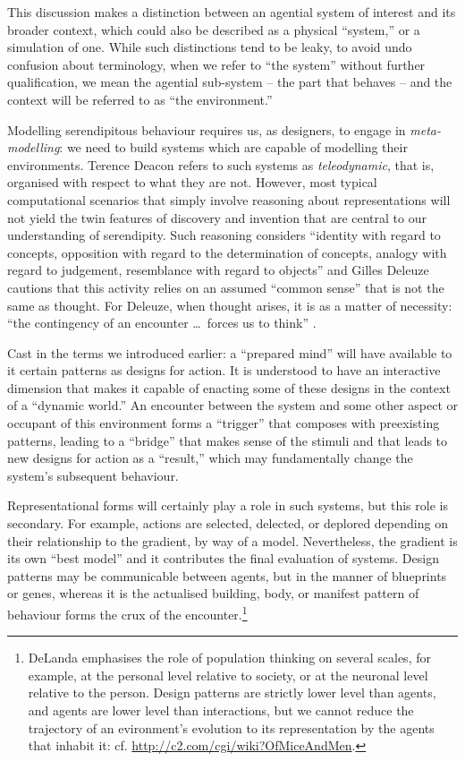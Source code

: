 This discussion makes a distinction between an agential system of
interest and its broader context, which could also be described as a
physical ``system,'' or a simulation of one.  While such distinctions
tend to be leaky, to avoid undo confusion about terminology, when we
refer to ``the system'' without further qualification, we mean the
agential sub-system -- the part that behaves -- and the context will
be referred to as ``the environment.''

Modelling serendipitous behaviour requires us, as designers, to engage
in \emph{meta-modelling}: we need to build systems which are capable
of modelling their environments.  Terence Deacon
\cite{deacon2006emergence} refers to such systems as
\emph{teleodynamic}, that is, organised with respect to what they are
not.
%
However, most typical computational scenarios that simply involve reasoning
about representations will not yield the twin features of discovery
and invention that are central to our understanding of serendipity.
Such reasoning considers
%
``identity with regard to concepts, opposition with regard to the determination of concepts, analogy with regard to judgement, resemblance with regard to objects''
%
and Gilles Deleuze \cite[p. 174]{deleuze1994difference} cautions that
this activity relies on an assumed ``common sense'' that is not the
same as thought.  For Deleuze, when thought arises, it is as a matter
of necessity: ``the contingency of an encounter \ldots\ forces us to
think'' \cite[p. 176]{deleuze1994difference}.

Cast in the terms we introduced earlier: a ``prepared mind'' will have
available to it certain patterns as designs for action.  It is
understood to have an interactive dimension that makes it capable of
enacting some of these designs in the context of a ``dynamic world.''
An encounter between the system and some other aspect or occupant of
this environment forms a ``trigger'' that composes with preexisting
patterns, leading to a ``bridge'' that makes sense of the stimuli and
that leads to new designs for action as a ``result,'' which may
fundamentally change the system's subsequent behaviour.

Representational forms will certainly play a role in such systems, but
this role is secondary.  For example, actions are selected, delected,
or deplored depending on their relationship to the gradient, by way of
a model.  Nevertheless, the gradient is its own ``best model'' and it
contributes the final evaluation of systems.
%
Design patterns may be communicable between agents, but in the manner
of blueprints or genes, whereas it is the actualised building, body,
or manifest pattern of behaviour forms the crux of the
encounter.\footnote{DeLanda \cite{delanda1993virtual} emphasises the
  role of population thinking on several scales, for example, at the
  personal level relative to society, or at the neuronal level
  relative to the person.  Design patterns are strictly lower level
  than agents, and agents are lower level than interactions, but we
  cannot reduce the trajectory of an evironment's evolution to its
  representation by the agents that inhabit it: cf.
  \url{http://c2.com/cgi/wiki?OfMiceAndMen}.}

